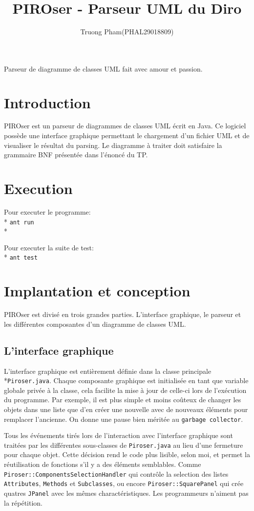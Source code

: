 \documentclass[12pt]{article}
\title{PIROser - Parseur UML du Diro}
\author{Truong Pham(PHAL29018809)}
\begin{document}
\maketitle

\abstract
Parseur de diagramme de classes UML fait avec amour et passion.
\section{Introduction}

PIROser est un parseur de diagrammes de classes UML écrit en Java. Ce logiciel possède une interface graphique permettant le chargement d'un fichier UML et de visualiser le résultat du parsing. Le diagramme à traiter doit satisfaire la grammaire BNF présentée dans l'énoncé du TP.

\section{Execution}
Pour executer le programme: \\*
\texttt{ant run}\\*

Pour executer la suite de test: \\*
\texttt{ant test}

\section{Implantation et conception}

PIROser est divisé en trois grandes parties. L'interface graphique, le parseur et les différentes composantes d'un diagramme de classes UML.

\subsection{L'interface graphique}

L'interface graphique est entièrement définie dans la classe principale \\*\texttt{Piroser.java}. Chaque composante graphique est initialisée en tant que variable globale privée à la classe, cela facilite la mise à jour de celle-ci lors de l'exécution du programme. Par exemple, il est plus simple et moins coûteux de changer les objets dans une liste que d'en créer une nouvelle avec de nouveaux éléments pour remplacer l'ancienne. On donne une pause bien méritée au \texttt{garbage collector}. 

Tous les événements tirés lors de l'interaction avec l'interface graphique sont traitées par les différentes sous-classes de  \texttt{Piroser.java} au lieu d'une fermeture pour chaque objet. Cette décision rend le code plus lisible, selon moi, et permet la réutilisation de fonctions s'il y a des éléments semblables. Comme \texttt{Piroser::ComponentsSelectionHandler} qui contrôle la selection des listes \texttt{Attributes}, \texttt{Methods} et \texttt{Subclasses}, ou encore \texttt{Piroser::SquarePanel} qui crée quatres \texttt{JPanel} avec les mêmes charactéristiques. Les programmeurs n'aiment pas la répétition.
\end{document}
